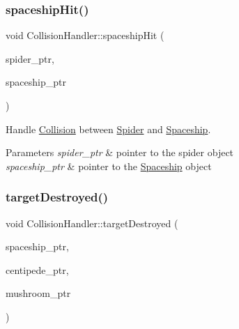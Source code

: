 \subsubsection{\texorpdfstring{spaceship\+Hit()}{spaceshipHit()}\hspace{0.1cm}{\footnotesize\ttfamily [2/2]}}
{\footnotesize\ttfamily void Collision\+Handler\+::spaceship\+Hit (\begin{DoxyParamCaption}\item[{shared\+\_\+ptr$<$ \mbox{\hyperlink{class_spider}{Spider}} $>$}]{spider\+\_\+ptr,  }\item[{shared\+\_\+ptr$<$ \mbox{\hyperlink{class_spaceship}{Spaceship}} $>$}]{spaceship\+\_\+ptr }\end{DoxyParamCaption})}



Handle \mbox{\hyperlink{class_collision}{Collision}} between \mbox{\hyperlink{class_spider}{Spider}} and \mbox{\hyperlink{class_spaceship}{Spaceship}}. 


\begin{DoxyParams}{Parameters}
{\em spider\+\_\+ptr} & pointer to the spider object \\
\hline
{\em spaceship\+\_\+ptr} & pointer to the \mbox{\hyperlink{class_spaceship}{Spaceship}} object \\
\hline
\end{DoxyParams}
\mbox{\label{class_collision_handler_a38653a91128ac260d2571be8d40c48bf}} 
\subsubsection{\texorpdfstring{target\+Destroyed()}{targetDestroyed()}\hspace{0.1cm}{\footnotesize\ttfamily [1/3]}}
{\footnotesize\ttfamily void Collision\+Handler\+::target\+Destroyed (\begin{DoxyParamCaption}\item[{shared\+\_\+ptr$<$ \mbox{\hyperlink{class_spaceship}{Spaceship}} $>$}]{spaceship\+\_\+ptr,  }\item[{shared\+\_\+ptr$<$ \mbox{\hyperlink{class_centipede}{Centipede}} $>$}]{centipede\+\_\+ptr,  }\item[{shared\+\_\+ptr$<$ \mbox{\hyperlink{class_mushroom_field}{Mushroom\+Field}} $>$}]{mushroom\+\_\+ptr }\end{DoxyParamCaption})}



